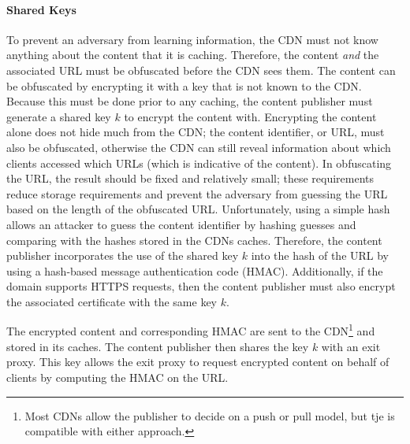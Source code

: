 \paragraph{Shared Keys} 
To prevent an adversary from learning information, the CDN must not know anything
about the
content that it is caching.  Therefore, the content {\it and} the associated URL
must be obfuscated
before the CDN sees them.  The content can be obfuscated by encrypting it with a
key that is not
known to the CDN.  Because this must be done prior to any caching, the content publisher must 
generate a shared key $k$ to encrypt the content with. Encrypting the content alone does not 
hide much from the CDN; the content identifier, or URL, must also be obfuscated, otherwise the 
CDN can still reveal information about which clients accessed which URLs (which is indicative 
of the content).  In obfuscating the URL, the result should be fixed and relatively
small; 
these requirements reduce storage requirements and prevent the adversary from guessing
the
URL based on the length of the obfuscated URL.  Unfortunately, using a simple hash allows an 
attacker to guess the content identifier by hashing guesses and comparing with 
the hashes stored in the CDNs caches.  Therefore, the content publisher incorporates the use 
of the shared key $k$ into the hash of the URL by using a hash-based message authentication code 
(HMAC).  Additionally, if the domain supports HTTPS requests, then the content publisher must 
also encrypt the associated certificate with the same key $k$.

The encrypted content and corresponding HMAC are sent to the CDN\footnote{Most CDNs
allow the publisher to
decide on a push or pull model, but tje \system{} is compatible with either approach.}
and stored in
its caches.  The content publisher then shares the key $k$ with an exit proxy. 
This key allows the 
exit proxy to request encrypted content on behalf of clients by computing the HMAC on the URL.  

